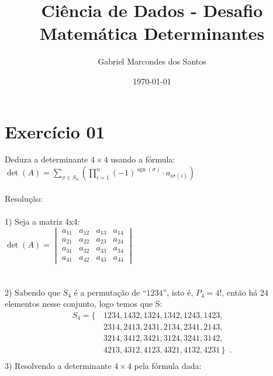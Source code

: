 \documentclass{report}
\title{Ciência de Dados - Desafio Matemática Determinantes}
\author{Gabriel Marcondes dos Santos}
\date{\today{}}
\DeclareMathOperator{\sgn}{sgn}
\begin{document}
\maketitle

\section{Exercício 01}
Deduza a determinante $4\times4$ usando a fórmula: \\ $\det(A)=\sum\limits_{\sigma\in S_{n}} (\prod\limits_{i=1}^{n} (-1)^{\sgn(\sigma)} \cdot a_{i\sigma(i)})$ \\\\
Resolução: \\\\
1) Seja a matriz 4x4: \\
$\det(A) = 
\begin{vmatrix}
a_{11} & a_{12} & a_{13} & a_{14} \\ 
a_{21} & a_{22} & a_{23} & a_{24} \\ 
a_{31} & a_{32} & a_{33} & a_{34} \\ 
a_{41} & a_{42} & a_{43} & a_{44}
\end{vmatrix}$ \\\\\\
2) Sabendo que $S_{4}$ é a permutação de ``$1234$'', isto é, $P_{4}= 4!$, então há 24 elementos nesse conjunto, logo temos que S: 
\begin{align*}
  S_{4} = \{\,
  & 1234, 1432, 1324, 1342, 1243, 1423, \\
  & 2314, 2413, 2431, 2134, 2341, 2143, \\
  & 3214, 3412, 3421, 3124, 3241, 3142, \\
  & 4213, 4312, 4123, 4321, 4132, 4231\,\}\enspace. \\
\end{align*}
3) Resolvendo a determinante $4\times4$ pela fórmula dada: \\
\end{document}
